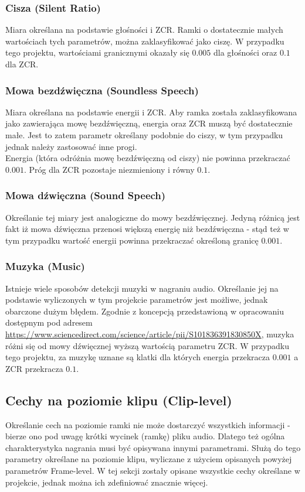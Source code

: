 \documentclass[a4paper]{article}
\begin{document}
\subsubsection{Cisza (Silent Ratio)}
Miara określana na podstawie głośności i ZCR. Ramki o dostatecznie małych wartościach tych parametrów, można zaklasyfikować jako ciszę. W przypadku tego projektu, wartościami granicznymi okazały się $0.005$ dla głośności oraz $0.1$ dla ZCR.

\subsubsection{Mowa bezdźwięczna (Soundless Speech)}
Miara określana na podstawie energii i ZCR. Aby ramka została zaklasyfikowana jako zawierająca mowę bezdźwięczną, energia oraz ZCR muszą być dostatecznie małe. Jest to zatem parametr określany podobnie do ciszy, w tym przypadku jednak należy zastosować inne progi.\\
Energia (która odróżnia mowę bezdźwięczną od ciszy) nie powinna przekraczać $0.001$. Próg dla ZCR pozostaje niezmieniony i równy $0.1$.

\subsubsection{Mowa dźwięczna (Sound Speech)}
Określanie tej miary jest analogiczne do mowy bezdźwięcznej. Jedyną różnicą jest fakt iż mowa dźwięczna przenosi większą energię niż bezdźwięczna - stąd też w tym przypadku wartość energii powinna przekraczać określoną granicę $0.001$.

\subsubsection{Muzyka (Music)}
Istnieje wiele sposobów detekcji muzyki w nagraniu audio. Określanie jej na podstawie wyliczonych w tym projekcie parametrów jest możliwe, jednak obarczone dużym błędem. Zgodnie z koncepcją przedstawioną w opracowaniu dostępnym pod adresem \url{https://www.sciencedirect.com/science/article/pii/S101836391830850X}, muzyka różni się od mowy dźwięcznej wyższą wartością parametru ZCR. W przypadku tego projektu, za muzykę uznane są klatki dla których energia przekracza $0.001$ a ZCR przekracza $0.1$.\\

\subsection{Cechy na poziomie klipu (Clip-level)}
Określanie cech na poziomie ramki nie może dostarczyć wszystkich informacji - bierze ono pod uwagę krótki wycinek (ramkę) pliku audio. Dlatego też ogólna charakterystyka nagrania musi być opisywana innymi parametrami. Służą do tego parametry określane na poziomie klipu, wyliczane z użyciem opisanych powyżej parametrów Frame-level. W tej sekcji zostały opisane wszystkie cechy określane w projekcie, jednak można ich zdefiniować znacznie więcej.
\end{document}

